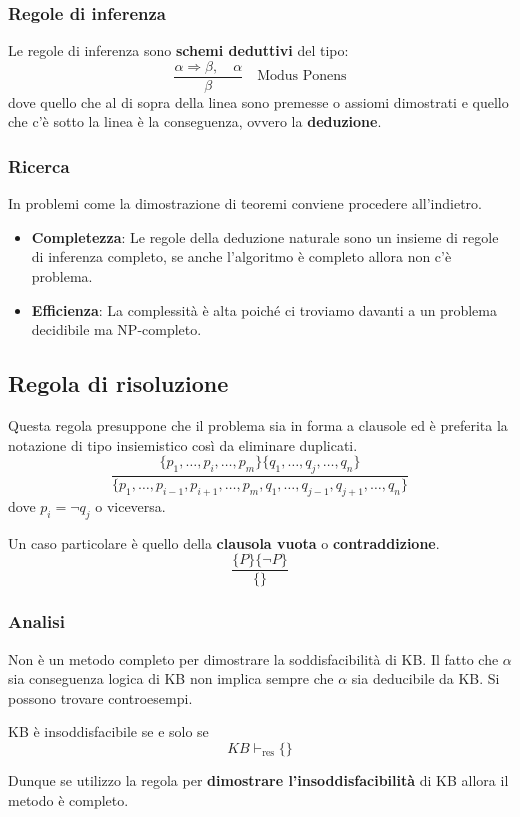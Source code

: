 \subsubsection{Regole di inferenza}
Le regole di inferenza sono \textbf{schemi deduttivi} del tipo:
\[ \frac{\alpha \Rightarrow \beta, \quad \alpha}{\beta} \quad \text{Modus Ponens} \]
dove quello che al di sopra della linea sono premesse o assiomi dimostrati e quello che c'\`e sotto la linea \`e la conseguenza,
ovvero la \textbf{deduzione}.

\subsubsection{Ricerca}
In problemi come la dimostrazione di teoremi conviene procedere all'indietro.
\begin{itemize}
	\item \textbf{Completezza}: Le regole della deduzione naturale sono un insieme di regole di inferenza completo, se anche l'algoritmo
	      \`e completo allora non c'\`e problema.
	\item \textbf{Efficienza}: La complessit\`a \`e alta poich\'e ci troviamo davanti a un problema decidibile ma NP-completo.
\end{itemize}

\subsection{Regola di risoluzione}
Questa regola presuppone che il problema sia in forma a clausole ed \`e preferita la notazione di tipo
insiemistico cos\`i da eliminare duplicati.
\[
	\frac{ \{ p_1, \dots, p_i, \dots, p_m \} \{ q_1, \dots, q_j, \dots, q_n \} }
	{ \{ p_1, \dots, p_{i-1}, p_{i+1}, \dots, p_{m}, q_1, \dots, q_{j-1}, q_{j+1}, \dots, q_n \} }
\]
dove $p_i = \lnot q_j$ o viceversa.


Un caso particolare \`e quello della \textbf{clausola vuota} o \textbf{contraddizione}.
\[ \frac{ \{ P \}\{ \lnot P \} }{ \{ \} } \]

\subsubsection{Analisi}
Non \`e un metodo completo per dimostrare la soddisfacibilit\`a di KB. Il fatto che $\alpha$ sia conseguenza
logica di KB non implica sempre che $\alpha$ sia deducibile da KB. Si possono trovare controesempi.

\begin{theorem}
	KB \`e insoddisfacibile se e solo se \[ KB \vdash_{\text{res}} \{ \} \]
\end{theorem}
Dunque se utilizzo la regola per \textbf{dimostrare l'insoddisfacibilit\`a} di KB allora il metodo \`e completo.

